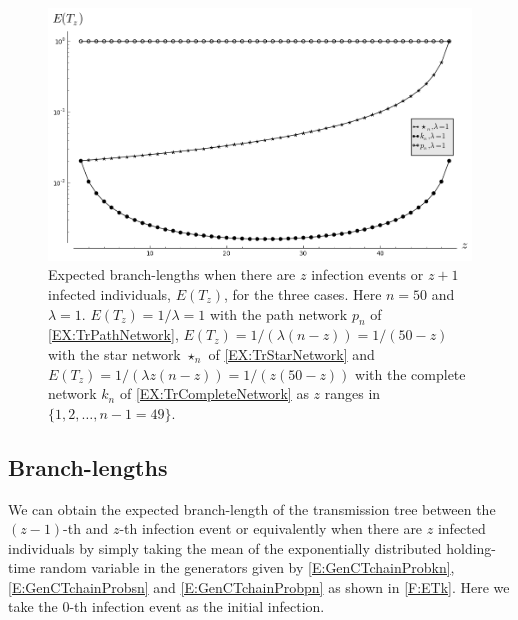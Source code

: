 \documentclass[review]{elsarticle}
\numberwithin{equation}{section}
\let\orgautoref\autoref
\renewcommand{\autoref}
        {\def\equationautorefname{Eq.}%
         \def\figureautorefname{Fig.}%
         \def\subfigureautorefname{Fig.}%
         \def\sectionautorefname{Sect.}%
         \def\subsectionautorefname{Sect.}%
         \def\subsubsectionautorefname{Sect.}%
         \def\Itemautorefname{item}%
         \def\tableautorefname{Table}%
         \def\propositionautorefname{Prop.}%
         \def\corollaryautorefname{Corollary}%
         \def\theoremautorefname{Theorem}%
         \def\remarkautorefname{Remark}%
         \def\lemmaautorefname{Lemma}%
         \def\proofofautorefname{Proof}%
         \def\exampleautorefname{Example}%
         \orgautoref}
\providecommand{\autorefs}
        {\def\equationautorefname{Eqs.}%
         \def\figureautorefname{Figs.}%
         \def\subfigureautorefname{Figs.}%
         \def\sectionautorefname{Sects.}%
         \def\subsectionautorefname{Sects.}%
         \def\subsubsectionautorefname{Sects.}%
         \def\Itemautorefname{items}%
         \def\tableautorefname{Tables}%
         \def\propositionautorefname{Props.}%
         \def\theoremautorefname{Theorems}%
         \def\theoremautorefname{Remarks}%
         \def\lemmaautorefname{Lemmas}%
         \def\proofofautorefname{Proofs}%
         \def\exampleautorefname{Examples}%
         \orgautoref}
\begin{document}
\begin{figure}[htbp]
\begin{center}
\begin {center}
\includegraphics[scale=0.45]{figures/ETk.png}
\end{center}
\caption{Expected branch-lengths when there are $z$ infection events or $z+1$ infected individuals, $E(T_z)$, for the three cases. Here $n=50$ and $\lambda=1$. $E(T_z)=1/\lambda=1$ with the path network $p_n$ of \autoref{EX:TrPathNetwork}, $E(T_z)=1/(\lambda(n-z))=1/(50-z)$ with the star network $\star_n$ of \autoref{EX:TrStarNetwork} and $E(T_z)=1/(\lambda z(n-z))=1/(z(50-z))$ with the complete network $k_n$ of \autoref{EX:TrCompleteNetwork} as $z$ ranges in $\{1,2,\ldots,n-1=49\}$.\label{F:ETk}}
\end{center}
\end{figure}

\subsection{Branch-lengths}
We can obtain the expected branch-length of the transmission tree between the $(z-1)$-th and $z$-th infection event or equivalently when there are $z$ infected individuals by simply taking the mean of the exponentially distributed holding-time random variable in the generators given by \autorefs{E:GenCTchainProbkn}, \ref{E:GenCTchainProbsn} and \ref{E:GenCTchainProbpn} as shown in \autoref{F:ETk}.  
Here we take the $0$-th infection event as the initial infection.
\end{document}
